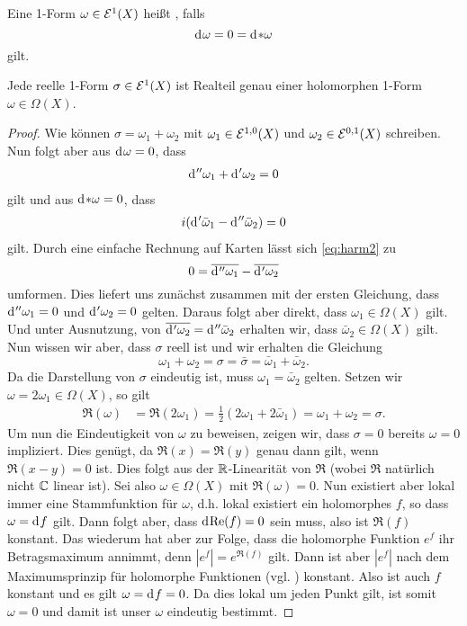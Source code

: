 \begin{defin}
  Eine 1-Form $\omega \in \mathcal{E}^1(X)$ heißt , falls
  \[
  \d[\omega] = 0 = \d[\ast \omega]
  \]
  gilt.
\end{defin}

\begin{thm}
  \label{thm:harm-form}
  Jede reelle 1-Form $\sigma \in \mathcal{E}^1(X)$ ist Realteil genau einer
  holomorphen 1-Form $\omega \in \Omega(X)$.
\end{thm}

\begin{proof}
  Wie können $\sigma = \omega_1 + \omega_2$ mit $\omega_1 \in
  \mathcal{E}^{1,0}(X)$ und $\omega_2 \in \mathcal{E}^{0,1}(X)$ schreiben. Nun
  folgt aber aus $\d[\omega] = 0$, dass
  \begin{align}
    \d[''\omega_1] + \d['\omega_2] = 0 \label{eq:harm1}
  \end{align}
  gilt und aus $\d[\ast \omega] = 0$, dass
  \begin{align}
  i(\d['\bar \omega_1] - \d[''\bar \omega_2]) = 0 \label{eq:harm2}
  \end{align}
  gilt. Durch eine einfache
  Rechnung auf Karten lässt sich \eqref{eq:harm2} zu
  \[
  0 = \overline{\d[''\omega_1]} - \overline{\d['\omega_2]}
  \]
  umformen. Dies liefert uns zunächst zusammen mit der ersten
  Gleichung, dass $\d[''\omega_1] = 0$ und $\d['\omega_2] = 0$
  gelten. Daraus folgt aber direkt, dass $\omega_1 \in \Omega(X)$
  gilt. Und unter Ausnutzung, von $\overline{\d['\omega_2]} = \d[''
  \bar \omega_2]$ erhalten wir, dass $\bar \omega_2 \in \Omega(X)$
  gilt. Nun wissen wir aber, dass $\sigma$ reell ist und wir erhalten
  die Gleichung
  \[
  \omega_1 + \omega_2 = \sigma = \bar \sigma = \bar \omega_1 + \bar
  \omega_2.
  \]
  Da die Darstellung von $\sigma$ eindeutig ist, muss $\omega_1 =
  \bar \omega_2$ gelten. Setzen wir $\omega = 2\omega_1 \in
  \Omega(X)$, so gilt
  \begin{align*}
    \Re(\omega) & = \Re(2\omega_1) = \frac{1}{2}( 2 \omega_1 + 2 \bar
    \omega_1) = \omega_1 + \omega_2 = \sigma.
  \end{align*}
  Um nun die Eindeutigkeit von $\omega$ zu beweisen, zeigen wir, dass
  $\sigma = 0$ bereits $\omega = 0$ impliziert. Dies genügt, da
  $\Re(x) = \Re(y)$ genau dann gilt, wenn $\Re(x-y) = 0$ ist. Dies
  folgt aus der $\mathbb{R}$-Linearität von $\Re$ (wobei $\Re$
  natürlich nicht $\mathbb{C}$ linear ist). Sei also $\omega \in \Omega(X)$
  mit $\Re(\omega) = 0$. Nun existiert aber lokal immer eine
  Stammfunktion für $\omega$, d.h. lokal existiert ein holomorphes
  $f$, so dass $\omega = \d[f]$ gilt. Dann folgt aber, dass
  $\d[\Re(f)] = 0$ sein muss, also ist $\Re(f)$ konstant. Das wiederum
  hat aber zur Folge, dass die holomorphe Funktion $e^f$ ihr
  Betragsmaximum annimmt, denn $|e^f| = e^{\Re(f)}$ gilt. Dann ist
  aber $|e^f|$ nach dem Maximumsprinzip für holomorphe Funktionen
  (vgl. \cite[Kor. 2.6]{For})
  konstant. Also ist auch $f$ konstant und es gilt $\omega = \d[f] =
  0$. Da dies lokal um jeden Punkt gilt, ist somit $\omega = 0$ und
  damit ist unser $\omega$ eindeutig bestimmt.
\end{proof}

